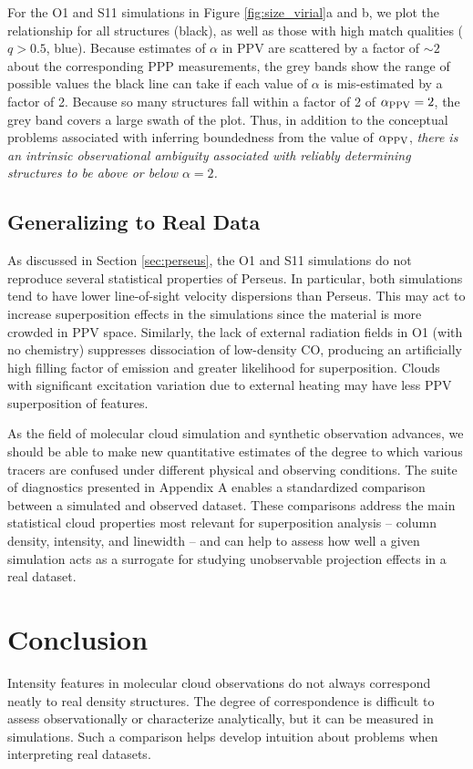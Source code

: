 For the O1 and S11 simulations in Figure \ref{fig:size_virial}a and b, we plot the relationship for all structures (black), as well as
those with high match qualities ($q > 0.5$, blue). Because estimates of $\alpha$ in PPV are scattered by a factor of $\sim2$ about the
corresponding PPP measurements, the grey bands show the range of possible values the black line can take if each value of $\alpha$ is mis-estimated by a factor of 2. Because so many structures fall within a factor of 2 of $\alpha_{\rm PPV}=2$, the grey band covers a large swath of the plot. Thus, in addition to the conceptual problems associated with inferring boundedness from the value of $\alpha_{\rm PPV}$, \textit{there is an intrinsic observational ambiguity associated with reliably determining structures to be above or below $\alpha=2$.}

\subsection{Generalizing to Real Data}
\label{sec:generalize}

As discussed in Section \ref{sec:perseus}, the O1 and S11 simulations
do not reproduce several statistical properties of Perseus. In
particular, both simulations tend to have lower line-of-sight
velocity dispersions than Perseus. This may act to increase
superposition effects in the simulations since the material is more
crowded in PPV space. Similarly, the lack of external radiation fields in O1 (with no chemistry) suppresses dissociation of low-density CO, producing an artificially high filling factor of emission and greater likelihood for superposition. Clouds with significant excitation
variation due to external heating may have less PPV superposition of features.

As the field of molecular cloud simulation and synthetic observation advances, we should be able to make new quantitative estimates of the degree to which various tracers are confused under different physical and observing conditions. The suite of diagnostics presented in Appendix A enables a standardized comparison between a simulated and observed dataset. These comparisons address the main statistical cloud properties most relevant for superposition analysis -- column density, intensity, and linewidth -- and can help to assess how well a given simulation acts as a surrogate for studying unobservable projection effects in a real dataset.

\section{Conclusion}
Intensity features in molecular cloud observations do not always correspond neatly to real density structures. The degree of correspondence is difficult to assess observationally or characterize analytically, but it can be measured in simulations. Such a comparison helps develop intuition about problems when interpreting real datasets.

